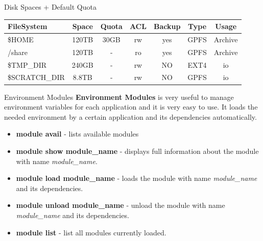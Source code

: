\documentclass[final,t]{beamer}
\begin{document}
\begin{frame}[fragile]{}
\begin{columns}[t]
\begin{column}{.32\linewidth}
      \begin{block}{Disk Spaces + Default Quota}
        \vspace*{-2ex}
      \begin{center}
      \begin{tabular}{|l|c|c|c|c|c|c|}
      \hline 
      \textbf{FileSystem} & \textbf{Space} & \textbf{Quota} & \textbf{ACL} & \textbf{Backup} & \textbf{Type} & \textbf{Usage}  \\ 
      \hline 
      \$HOME & 120TB & 30GB & rw & yes & GPFS & Archive \\ 
      \hline 
      /share & 120TB & - & ro & yes & GPFS & Archive \\ 
      \hline 
      \$TMP\_DIR & 240GB & - & rw & NO & EXT4 & io \\ 
      \hline 
      \$SCRATCH\_DIR & 8.8TB & - & rw & NO & GPFS & io \\ 
      \hline 
      \end{tabular} 
      \end{center}
        \vspace*{-2ex}
      \end{block}
 
 

      \begin{block}{Environment Modules}
      \textbf{Environment Modules} is very useful to manage environment variables for each application and it is very easy to use. It loads the needed environment by a certain application and its dependencies automatically.
        \begin{itemize}
        \item  \textbf{module avail} - lists available modules
        \item  \textbf{module show module\_name} - displays full information about the module with name \textit{module\_name}.
        \item  \textbf{module load module\_name} - loads the module with name \textit{module\_name} and its dependencies. 
        \item  \textbf{module unload module\_name } - unload  the module with name \textit{module\_name} and its dependencies. 
        \item  \textbf{module list} - list all modules currently loaded.
        \end{itemize}
      \end{block}
 


\end{column}
\end{columns}
\end{frame}
\end{document}
